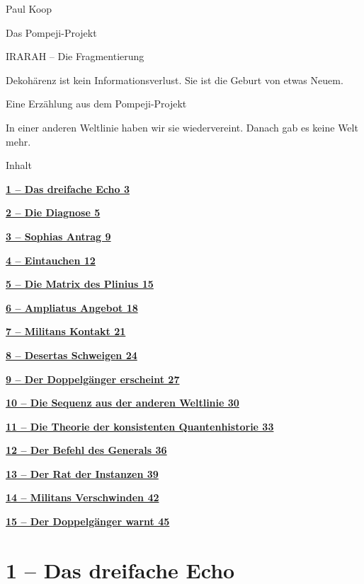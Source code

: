 \documentclass[
]{article}
\author{}
\date{}
\begin{document}
{
\setcounter{tocdepth}{3}
\tableofcontents
}
Paul Koop

Das Pompeji-Projekt

IRARAH -- Die Fragmentierung

Dekohärenz ist kein Informationsverlust. Sie ist die Geburt von etwas Neuem.

Eine Erzählung aus dem Pompeji-Projekt

In einer anderen Weltlinie haben wir sie wiedervereint. Danach gab es keine Welt mehr.

Inhalt

\hyperref[das-dreifache-echo]{\textbf{1 -- Das dreifache Echo 3}}

\hyperref[die-diagnose]{\textbf{2 -- Die Diagnose 5}}

\hyperref[sophias-antrag]{\textbf{3 -- Sophias Antrag 9}}

\hyperref[eintauchen]{\textbf{4 -- Eintauchen 12}}

\hyperref[die-matrix-des-plinius]{\textbf{5 -- Die Matrix des Plinius 15}}

\hyperref[ampliatus-angebot]{\textbf{6 -- Ampliatus\textquotesingle{} Angebot 18}}

\hyperref[militans-kontakt]{\textbf{7 -- Militans\textquotesingle{} Kontakt 21}}

\hyperref[desertas-schweigen]{\textbf{8 -- Desertas Schweigen 24}}

\hyperref[der-doppelguxe4nger-erscheint]{\textbf{9 -- Der Doppelgänger erscheint 27}}

\hyperref[die-sequenz-aus-der-anderen-weltlinie]{\textbf{10 -- Die Sequenz aus der anderen Weltlinie 30}}

\hyperref[die-theorie-der-konsistenten-quantenhistorie]{\textbf{11 -- Die Theorie der konsistenten Quantenhistorie 33}}

\hyperref[der-befehl-des-generals]{\textbf{12 -- Der Befehl des Generals 36}}

\hyperref[der-rat-der-instanzen]{\textbf{13 -- Der Rat der Instanzen 39}}

\hyperref[militans-verschwinden]{\textbf{14 -- Militans\textquotesingle{} Verschwinden 42}}

\hyperref[der-doppelguxe4nger-warnt]{\textbf{15 -- Der Doppelgänger warnt 45}}

\section{1 -- Das dreifache Echo}\label{das-dreifache-echo}
\end{document}
